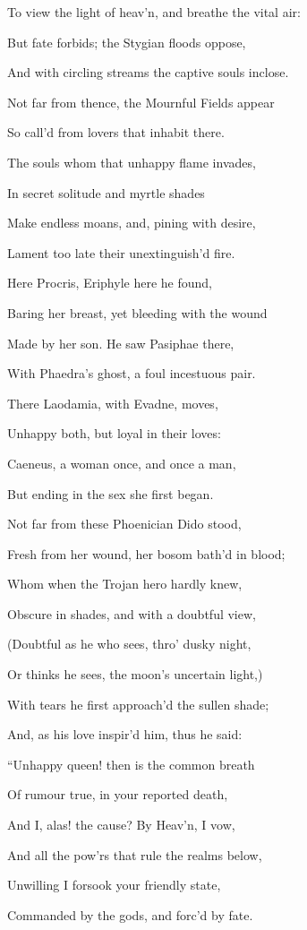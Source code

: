 To view the light of heav’n, and breathe the vital air:

But fate forbids; the Stygian floods oppose,

And with circling streams the captive souls inclose.

Not far from thence, the Mournful Fields appear

So call’d from lovers that inhabit there.

The souls whom that unhappy flame invades,

In secret solitude and myrtle shades

Make endless moans, and, pining with desire,

Lament too late their unextinguish’d fire.

Here Procris, Eriphyle here he found,

Baring her breast, yet bleeding with the wound

Made by her son. He saw Pasiphae there,

With Phaedra’s ghost, a foul incestuous pair.

There Laodamia, with Evadne, moves,

Unhappy both, but loyal in their loves:

Caeneus, a woman once, and once a man,

But ending in the sex she first began.

Not far from these Phoenician Dido stood,

Fresh from her wound, her bosom bath’d in blood;

Whom when the Trojan hero hardly knew,

Obscure in shades, and with a doubtful view,

(Doubtful as he who sees, thro’ dusky night,

Or thinks he sees, the moon’s uncertain light,)

With tears he first approach’d the sullen shade;

And, as his love inspir’d him, thus he said:

“Unhappy queen! then is the common breath

Of rumour true, in your reported death,

And I, alas! the cause? By Heav’n, I vow,

And all the pow’rs that rule the realms below,

Unwilling I forsook your friendly state,

Commanded by the gods, and forc’d by fate.


